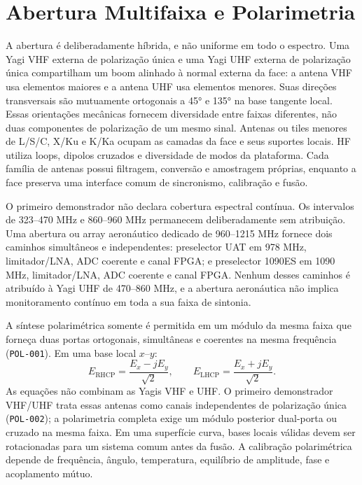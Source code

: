 \chapter{Abertura Multifaixa e Polarimetria}

A abertura é deliberadamente híbrida, e não uniforme em todo o espectro. Uma Yagi VHF externa de polarização única e uma Yagi UHF externa de polarização única compartilham um boom alinhado à normal externa da face: a antena VHF usa elementos maiores e a antena UHF usa elementos menores. Suas direções transversais são mutuamente ortogonais a 45° e 135° na base tangente local. Essas orientações mecânicas fornecem diversidade entre faixas diferentes, não duas componentes de polarização de um mesmo sinal. Antenas ou tiles menores de L/S/C, X/Ku e K/Ka ocupam as camadas da face e seus suportes locais. HF utiliza loops, dipolos cruzados e diversidade de modos da plataforma. Cada família de antenas possui filtragem, conversão e amostragem próprias, enquanto a face preserva uma interface comum de sincronismo, calibração e fusão.

O primeiro demonstrador não declara cobertura espectral contínua. Os intervalos de 323--470 MHz e 860--960 MHz permanecem deliberadamente sem atribuição. Uma abertura ou array aeronáutico dedicado de 960--1215 MHz fornece dois caminhos simultâneos e independentes: preselector UAT em 978 MHz, limitador/LNA, ADC coerente e canal FPGA; e preselector 1090ES em 1090 MHz, limitador/LNA, ADC coerente e canal FPGA. Nenhum desses caminhos é atribuído à Yagi UHF de 470--860 MHz, e a abertura aeronáutica não implica monitoramento contínuo em toda a sua faixa de sintonia.

A síntese polarimétrica somente é permitida em um módulo da mesma faixa que forneça duas portas ortogonais, simultâneas e coerentes na mesma frequência (\texttt{POL-001}). Em uma base local $x$--$y$:
\[
E_{\mathrm{RHCP}}=\frac{E_x-jE_y}{\sqrt{2}},\qquad E_{\mathrm{LHCP}}=\frac{E_x+jE_y}{\sqrt{2}}.
\]
As equações não combinam as Yagis VHF e UHF. O primeiro demonstrador VHF/UHF trata essas antenas como canais independentes de polarização única (\texttt{POL-002}); a polarimetria completa exige um módulo posterior dual-porta ou cruzado na mesma faixa. Em uma superfície curva, bases locais válidas devem ser rotacionadas para um sistema comum antes da fusão. A calibração polarimétrica depende de frequência, ângulo, temperatura, equilíbrio de amplitude, fase e acoplamento mútuo.


